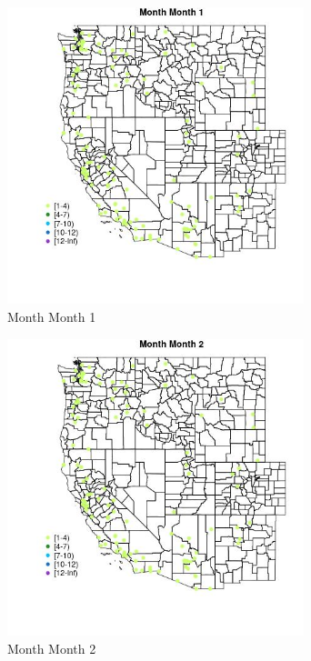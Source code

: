 \begin{figure} 
\centering  
\includegraphics[width=0.77\textwidth]{Code_Outputs/Report_ML_input_PM25_Step4_part_e_de_duplicated_aves_MapObsMo1Month.jpg} 
\caption{\label{fig:Report_ML_input_PM25_Step4_part_e_de_duplicated_avesMapObsMo1Month}Month Month 1} 
\end{figure} 
 

\begin{figure} 
\centering  
\includegraphics[width=0.77\textwidth]{Code_Outputs/Report_ML_input_PM25_Step4_part_e_de_duplicated_aves_MapObsMo2Month.jpg} 
\caption{\label{fig:Report_ML_input_PM25_Step4_part_e_de_duplicated_avesMapObsMo2Month}Month Month 2} 
\end{figure} 
 

